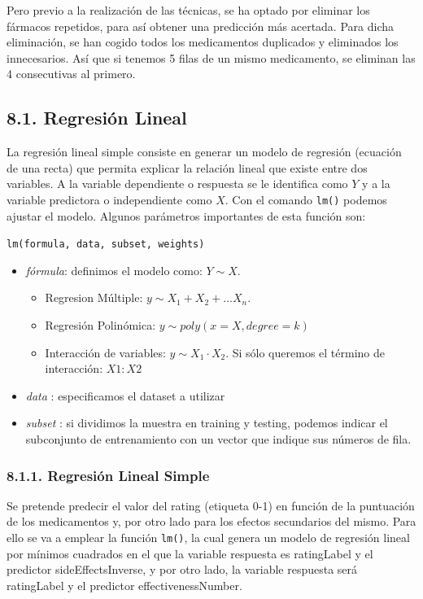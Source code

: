 \documentclass[spanish,]{article}
\providecommand{\tightlist}{%
  \setlength{\itemsep}{0pt}\setlength{\parskip}{0pt}}
\begin{document}
Pero previo a la realización de las técnicas, se ha optado por eliminar
los fármacos repetidos, para así obtener una predicción más acertada.
Para dicha eliminación, se han cogido todos los medicamentos duplicados
y eliminados los innecesarios. Así que si tenemos 5 filas de un mismo
medicamento, se eliminan las 4 consecutivas al primero.

\subsection{8.1. Regresión Lineal}\label{regresion-lineal}

La regresión lineal simple consiste en generar un modelo de regresión
(ecuación de una recta) que permita explicar la relación lineal que
existe entre dos variables. A la variable dependiente o respuesta se le
identifica como \(Y\) y a la variable predictora o independiente como
\(X\). Con el comando \texttt{lm()} podemos ajustar el modelo. Algunos
parámetros importantes de esta función son:

\texttt{lm(formula,\ data,\ subset,\ weights)}

\begin{itemize}
\tightlist
\item
  \emph{fórmula}: definimos el modelo como: \(Y \sim X\).

  \begin{itemize}
  \tightlist
  \item
    Regresion Múltiple: \(y \sim X_1+X_2+...X_n\).
  \item
    Regresión Polinómica: \(y \sim poly(x = X, degree = k)\)
  \item
    Interacción de variables: \(y \sim X_1 \cdot X_2\). Si sólo queremos
    el término de interacción: \(X1:X2\)
  \end{itemize}
\item
  \emph{data} : especificamos el dataset a utilizar
\item
  \emph{subset} : si dividimos la muestra en training y testing, podemos
  indicar el subconjunto de entrenamiento con un vector que indique sus
  números de fila.
\end{itemize}

\subsubsection{8.1.1. Regresión Lineal
Simple}\label{regresion-lineal-simple}

Se pretende predecir el valor del rating (etiqueta 0-1) en función de la
puntuación de los medicamentos y, por otro lado para los efectos
secundarios del mismo. Para ello se va a emplear la función
\texttt{lm()}, la cual genera un modelo de regresión lineal por mínimos
cuadrados en el que la variable respuesta es ratingLabel y el predictor
sideEffectsInverse, y por otro lado, la variable respuesta será
ratingLabel y el predictor effectivenessNumber.
\end{document}
